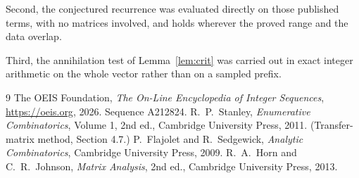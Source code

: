 \documentclass[11pt,a4paper]{article}
\theoremstyle{plain}
\theoremstyle{definition}
\begin{document}
Second, the conjectured recurrence was evaluated directly on those published terms, with no
matrices involved, and holds wherever the proved range and the data overlap.

Third, the annihilation test of Lemma~\ref{lem:crit} was carried out in exact integer
arithmetic on the whole vector rather than on a sampled prefix.

\begin{thebibliography}{9}
 The OEIS Foundation, \emph{The On-Line Encyclopedia of Integer
Sequences}, \url{https://oeis.org}, 2026. Sequence A212824.
 R.~P.~Stanley, \emph{Enumerative Combinatorics}, Volume 1, 2nd ed.,
Cambridge University Press, 2011. (Transfer-matrix method, Section 4.7.)
 P.~Flajolet and R.~Sedgewick, \emph{Analytic Combinatorics}, Cambridge
University Press, 2009.
 R.~A.~Horn and C.~R.~Johnson, \emph{Matrix Analysis}, 2nd ed., Cambridge
University Press, 2013.
\end{thebibliography}
\end{document}
